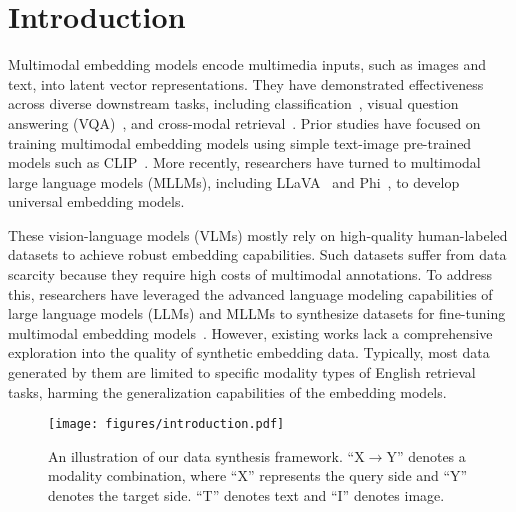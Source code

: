 \section{Introduction}

Multimodal embedding models encode multimedia inputs, such as images and text, into latent vector representations.
They have demonstrated effectiveness across diverse downstream tasks, including classification~\cite{ImageNet-1K}, visual question answering (VQA)~\cite{TextVQA}, and cross-modal retrieval~\cite{OVEN}. 
Prior studies have focused on training multimodal embedding models using simple text-image pre-trained models such as CLIP~\cite{CLIP}. 
More recently, researchers have turned to multimodal large language models (MLLMs), including LLaVA~\cite{Llava} and Phi~\cite{Phi3}, to develop universal embedding models.

These vision-language models (VLMs) mostly rely on high-quality human-labeled datasets to achieve robust embedding capabilities. 
Such datasets suffer from data scarcity because they require high costs of multimodal annotations.
To address this, researchers have leveraged the advanced language modeling capabilities of large language models (LLMs) and MLLMs to synthesize datasets for fine-tuning multimodal embedding models~\cite{MagicLens, megapairs, GME}.
However, existing works lack a comprehensive exploration into the quality of synthetic embedding data.
Typically, most data generated by them are limited to specific modality types of English retrieval tasks, harming the generalization capabilities of the embedding models.

\begin{figure}[!t]
	\centering
	\texttt{[image: figures/introduction.pdf]}%
	\caption{An illustration of our data synthesis framework. ``X$\rightarrow$Y'' denotes a modality combination, where ``X'' represents the query side and ``Y'' denotes the target side. ``T'' denotes text and ``I'' denotes image.}
	\vspace{-2ex}
	\label{fig:introduction}
\end{figure}

